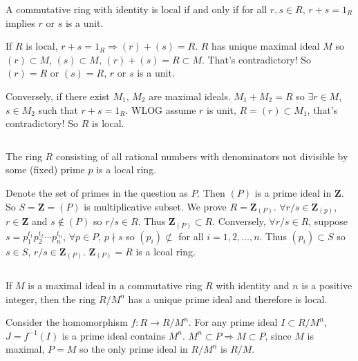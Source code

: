 $$ $$

\begin{ex}
    A commutative ring with identity is local if and only if for all $r,s\in R$, $r+s=1_{R}$ implies $r$ or $s$ is a unit.
\end{ex}

\begin{answer}
    If $R$ is local, $r+s=1_{R}\Rightarrow(r)+(s)=R$. $R$ has unique maximal ideal $M$ so $(r)\subset M$, $(s)\subset M$, $(r)+(s)=R\subset M$. That's contradictory! So $(r)=R$ or $(s)=R$, $r$ or $s$ is a unit.

    Conversely, if there exist $M_{1}$, $M_{2}$ are maximal ideals. $M_{1}+M_{2}=R$ so $\exists r\in M$, $s\in M_{2}$ such that $r+s=1_{R}$. WLOG assume $r$ is unit, $R=(r)\subset M_{1}$, that's contradictory! So $R$ is local.
\end{answer}

$$ $$

\begin{ex}
    The ring $R$ consisting of all rational numbers with denominators not divisible by some (fixed) prime $p$ is a local ring.
\end{ex}

\begin{answer}
    Denote the set of primes in the question as $P$. Then $(P)$ is a prime ideal in $\mathbf{Z}$. So $S=\mathbf{Z}=(P)$ is multiplicative subset. We prove $R=\mathbf{Z}_{(P)}$. $\forall r /s\in \mathbf{Z}_{(p)}$, $r\in\mathbf{Z}$ and $s\notin (P)$ so $r /s\in R$. Thus $\mathbf{Z}_{(P)}\subset R$. Conversely, $\forall r /s \in R$, suppose $s=p_{1}^{t_{1}}p_{2}^{t_{2}}\cdots p_{n}^{t_{n}}$, $\forall p\in P$, $p\nmid s$ so $(p_{i})\not\subset$ for all $i=1,2,\dots,n$. Thus $(p_{i})\subset S$ so $s\in S$, $r /s\in \mathbf{Z}_{(P)}$. $\mathbf{Z}_{(P)}=R$ is a lcoal ring.
\end{answer}

$$ $$

\begin{ex}
    If $M$ is a maximal ideal in a commutative ring $R$ with identity and $n$ is a positive integer, then the ring $R /M^{n}$ has a unique prime ideal and therefore is local.
\end{ex}

\begin{answer}
    Consider the homomorphism $f:R\to R /M^{n}$. For any prime ideal $I\subset R /M^{n}$, $J=f^{-1}(I)$ is a prime ideal contains $M^{n}$. $M^{n}\subset P\Rightarrow M\subset P$, since $M$ is maximal, $P=M$ so the only prime ideal in $R /M^{n}$ is $R /M$.
\end{answer}

